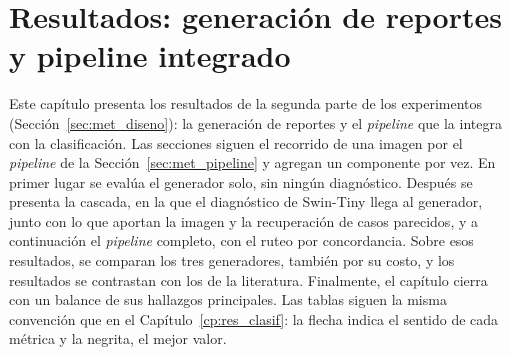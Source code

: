 \chapter[Resultados: generación de reportes]{Resultados: generación de reportes y pipeline integrado}
\label{cp:res_gen}
%


Este capítulo presenta los resultados de la segunda parte de los experimentos (Sección~\ref{sec:met_diseno}): la
generación de reportes y el \emph{pipeline} que la integra con la clasificación. Las secciones siguen el recorrido de
una imagen por el \emph{pipeline} de la Sección~\ref{sec:met_pipeline} y agregan un componente por vez. En primer
lugar se evalúa el generador solo, sin ningún diagnóstico. Después se presenta la cascada, en la que el diagnóstico de
Swin-Tiny llega al generador, junto con lo que aportan la imagen y la recuperación de casos parecidos, y a
continuación el \emph{pipeline} completo, con el ruteo por concordancia. Sobre esos resultados, se comparan los tres
generadores, también por su costo, y los resultados se contrastan con los de la literatura. Finalmente, el capítulo
cierra con un balance de sus hallazgos principales. Las tablas siguen la misma convención que en el
Capítulo~\ref{cp:res_clasif}: la flecha indica el sentido de cada métrica y la negrita, el mejor valor.







